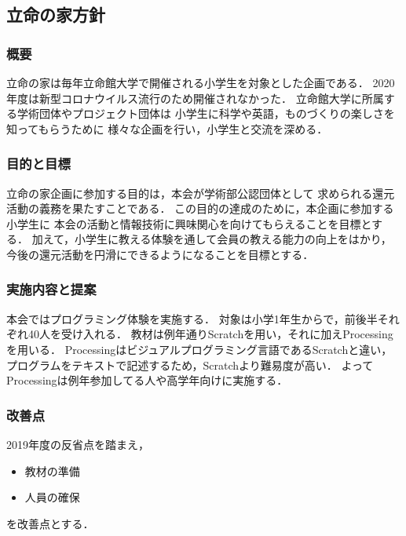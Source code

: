 \subsection*{立命の家方針}

\subsubsection*{概要}
立命の家は毎年立命館大学で開催される小学生を対象とした企画である．
2020年度は新型コロナウイルス流行のため開催されなかった．
立命館大学に所属する学術団体やプロジェクト団体は
小学生に科学や英語，ものづくりの楽しさを知ってもらうために
様々な企画を行い，小学生と交流を深める．

\subsubsection*{目的と目標}
立命の家企画に参加する目的は，本会が学術部公認団体として
求められる還元活動の義務を果たすことである．
この目的の達成のために，本企画に参加する小学生に
本会の活動と情報技術に興味関心を向けてもらえることを目標とする．
加えて，小学生に教える体験を通して会員の教える能力の向上をはかり，
今後の還元活動を円滑にできるようになることを目標とする．

\subsubsection*{実施内容と提案}
本会ではプログラミング体験を実施する．
対象は小学1年生からで，前後半それぞれ40人を受け入れる．
教材は例年通りScratchを用い，それに加えProcessingを用いる．
Processingはビジュアルプログラミング言語であるScratchと違い，
プログラムをテキストで記述するため，Scratchより難易度が高い．
よってProcessingは例年参加してる人や高学年向けに実施する．

\subsubsection*{改善点}
2019年度の反省点を踏まえ，
\begin{itemize}
  \item 教材の準備
  \item 人員の確保
\end{itemize}
を改善点とする．


